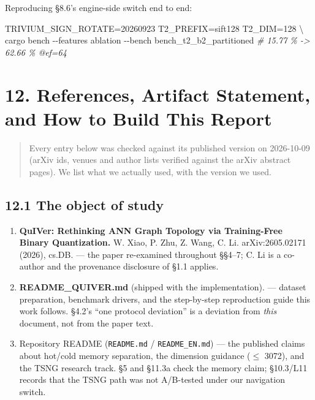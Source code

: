 \documentclass[
  10pt,
]{article}
\newenvironment{Shaded}{}{}
\newcommand{\AttributeTok}[1]{\textcolor[rgb]{0.49,0.56,0.16}{#1}}
\newcommand{\CommentTok}[1]{\textcolor[rgb]{0.38,0.63,0.69}{\textit{#1}}}
\newcommand{\DataTypeTok}[1]{\textcolor[rgb]{0.56,0.13,0.00}{#1}}
\newcommand{\ExtensionTok}[1]{#1}
\newcommand{\NormalTok}[1]{#1}
\newcommand{\OperatorTok}[1]{\textcolor[rgb]{0.40,0.40,0.40}{#1}}
\newcommand{\VariableTok}[1]{\textcolor[rgb]{0.10,0.09,0.49}{#1}}
\providecommand{\tightlist}{%
  \setlength{\itemsep}{0pt}\setlength{\parskip}{0pt}}
\begin{document}
Reproducing §8.6's engine-side switch end to end:

\begin{Shaded}
\begin{Highlighting}[]
\VariableTok{TRIVIUM\_SIGN\_ROTATE}\OperatorTok{=}\NormalTok{20260923 }\VariableTok{T2\_PREFIX}\OperatorTok{=}\NormalTok{sift128 }\VariableTok{T2\_DIM}\OperatorTok{=}\NormalTok{128 }\DataTypeTok{\textbackslash{}}
  \ExtensionTok{cargo}\NormalTok{ bench }\AttributeTok{{-}{-}features}\NormalTok{ ablation }\AttributeTok{{-}{-}bench}\NormalTok{ bench\_t2\_b2\_partitioned   }\CommentTok{\# 15.77 \% {-}\textgreater{} 62.66 \% @ef=64}
\end{Highlighting}
\end{Shaded}

\section{12. References, Artifact Statement, and How to Build This
Report}\label{references-artifact-statement-and-how-to-build-this-report}

\begin{quote}
Every entry below was checked against its published version on
2026-10-09 (arXiv ids, venues and author lists verified against the
arXiv abstract pages). We list what we actually used, with the version
we used.
\end{quote}

\subsection{12.1 The object of study}\label{the-object-of-study}

\begin{enumerate}
\def\labelenumi{\arabic{enumi}.}
\tightlist
\item
  \textbf{QuIVer: Rethinking ANN Graph Topology via Training-Free Binary
  Quantization.} W. Xiao, P. Zhu, Z. Wang, C. Li. arXiv:2605.02171
  (2026), cs.DB. --- the paper re-examined throughout §§4--7; C. Li is a
  co-author and the provenance disclosure of §1.1 applies.
\item
  \textbf{README\_QUIVER.md} (shipped with the implementation). ---
  dataset preparation, benchmark drivers, and the step-by-step
  reproduction guide this work follows. §4.2's ``one protocol
  deviation'' is a deviation from \emph{this} document, not from the
  paper text.
\item
  Repository README (\texttt{README.md} / \texttt{README\_EN.md}) ---
  the published claims about hot/cold memory separation, the dimension
  guidance ($\leq$ 3072), and the TSNG research track. §5 and §11.3a check
  the memory claim; §10.3/L11 records that the TSNG path was not
  A/B-tested under our navigation switch.
\end{enumerate}
\end{document}
